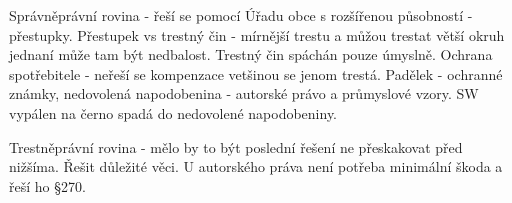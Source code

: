 \documentclass[12pt,a4paper,czech]{article}
\begin{document}
Správněprávní rovina - řeší se pomocí Úřadu obce s rozšířenou působností - přestupky. Přestupek vs trestný čin - mírnější trestu a můžou trestat větší okruh jednaní může tam být nedbalost. Trestný čin spáchán pouze úmyslně. Ochrana spotřebitele - neřeší se kompenzace vetšinou se jenom trestá. Padělek - ochranné známky, nedovolená napodobenina - autorské právo a průmyslové vzory. SW vypálen na černo spadá do nedovolené napodobeniny.

Trestněprávní rovina - mělo by to být poslední řešení ne přeskakovat před nižšíma. Řešit důležité věci. U autorského práva není potřeba minimální škoda a řeší ho §270. 


\end{document}

